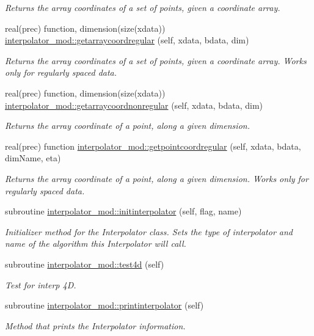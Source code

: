 \begin{DoxyCompactItemize}
\begin{DoxyCompactList}\small\item\em Returns the array coordinates of a set of points, given a coordinate array. \end{DoxyCompactList}\item 
real(prec) function, dimension(size(xdata)) \mbox{\hyperlink{namespaceinterpolator__mod_af568a0d2fbcd2dc571f47372a8f4cce8}{interpolator\+\_\+mod\+::getarraycoordregular}} (self, xdata, bdata, dim)
\begin{DoxyCompactList}\small\item\em Returns the array coordinates of a set of points, given a coordinate array. Works only for regularly spaced data. \end{DoxyCompactList}\item 
real(prec) function, dimension(size(xdata)) \mbox{\hyperlink{namespaceinterpolator__mod_a8c61cbe21c0cf09029e9117b7b1520df}{interpolator\+\_\+mod\+::getarraycoordnonregular}} (self, xdata, bdata, dim)
\begin{DoxyCompactList}\small\item\em Returns the array coordinate of a point, along a given dimension. \end{DoxyCompactList}\item 
real(prec) function \mbox{\hyperlink{namespaceinterpolator__mod_ab47cccb1adf61dcfca1b1ca5a5d213cd}{interpolator\+\_\+mod\+::getpointcoordregular}} (self, xdata, bdata, dim\+Name, eta)
\begin{DoxyCompactList}\small\item\em Returns the array coordinate of a point, along a given dimension. Works only for regularly spaced data. \end{DoxyCompactList}\item 
subroutine \mbox{\hyperlink{namespaceinterpolator__mod_adcaf3bba800f19991ed4f33c968184e9}{interpolator\+\_\+mod\+::initinterpolator}} (self, flag, name)
\begin{DoxyCompactList}\small\item\em Initializer method for the Interpolator class. Sets the type of interpolator and name of the algorithm this Interpolator will call. \end{DoxyCompactList}\item 
subroutine \mbox{\hyperlink{namespaceinterpolator__mod_ac27ad06522b34071302dc09d10b0ec7e}{interpolator\+\_\+mod\+::test4d}} (self)
\begin{DoxyCompactList}\small\item\em Test for interp 4D. \end{DoxyCompactList}\item 
subroutine \mbox{\hyperlink{namespaceinterpolator__mod_a9b149bc8a3da5d1864b8c049f8b00697}{interpolator\+\_\+mod\+::printinterpolator}} (self)
\begin{DoxyCompactList}\small\item\em Method that prints the Interpolator information. \end{DoxyCompactList}\end{DoxyCompactItemize}
